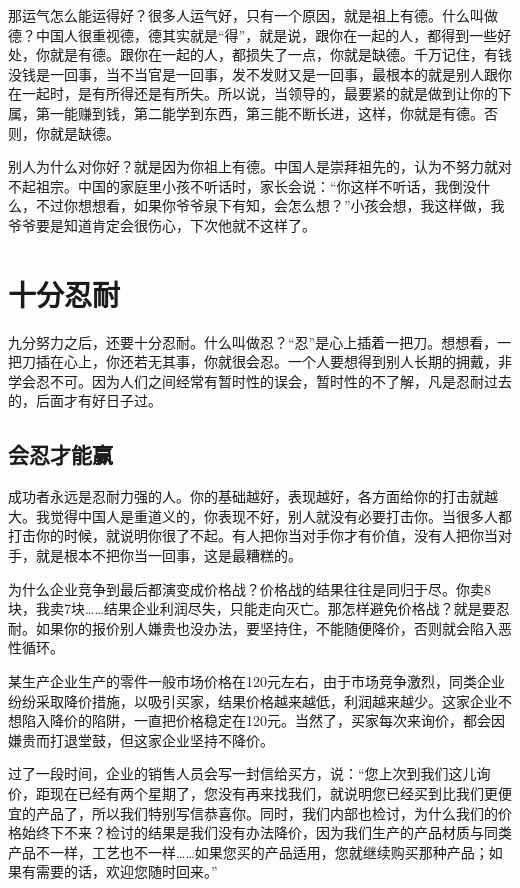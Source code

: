 \documentclass[fontset=fandol, a4paper, 12pt, openright]{ctexbook}
\begin{document}
那运气怎么能运得好？很多人运气好，只有一个原因，就是祖上有德。什么叫做德？中国人很重视德，德其实就是“得”，就是说，跟你在一起的人，都得到一些好处，你就是有德。跟你在一起的人，都损失了一点，你就是缺德。千万记住，有钱没钱是一回事，当不当官是一回事，发不发财又是一回事，最根本的就是别人跟你在一起时，是有所得还是有所失。所以说，当领导的，最要紧的就是做到让你的下属，第一能赚到钱，第二能学到东西，第三能不断长进，这样，你就是有德。否则，你就是缺德。

别人为什么对你好？就是因为你祖上有德。中国人是崇拜祖先的，认为不努力就对不起祖宗。中国的家庭里小孩不听话时，家长会说：“你这样不听话，我倒没什么，不过你想想看，如果你爷爷泉下有知，会怎么想？”小孩会想，我这样做，我爷爷要是知道肯定会很伤心，下次他就不这样了。


\chapter{十分忍耐}
九分努力之后，还要十分忍耐。什么叫做忍？“忍”是心上插着一把刀。想想看，一把刀插在心上，你还若无其事，你就很会忍。一个人要想得到别人长期的拥戴，非学会忍不可。因为人们之间经常有暂时性的误会，暂时性的不了解，凡是忍耐过去的，后面才有好日子过。

\section{会忍才能赢}

成功者永远是忍耐力强的人。你的基础越好，表现越好，各方面给你的打击就越大。我觉得中国人是重道义的，你表现不好，别人就没有必要打击你。当很多人都打击你的时候，就说明你很了不起。有人把你当对手你才有价值，没有人把你当对手，就是根本不把你当一回事，这是最糟糕的。

为什么企业竞争到最后都演变成价格战？价格战的结果往往是同归于尽。你卖8块，我卖7块……结果企业利润尽失，只能走向灭亡。那怎样避免价格战？就是要忍耐。如果你的报价别人嫌贵也没办法，要坚持住，不能随便降价，否则就会陷入恶性循环。

某生产企业生产的零件一般市场价格在120元左右，由于市场竞争激烈，同类企业纷纷采取降价措施，以吸引买家，结果价格越来越低，利润越来越少。这家企业不想陷入降价的陷阱，一直把价格稳定在120元。当然了，买家每次来询价，都会因嫌贵而打退堂鼓，但这家企业坚持不降价。

过了一段时间，企业的销售人员会写一封信给买方，说：“您上次到我们这儿询价，距现在已经有两个星期了，您没有再来找我们，就说明您已经买到比我们更便宜的产品了，所以我们特别写信恭喜你。同时，我们内部也检讨，为什么我们的价格始终下不来？检讨的结果是我们没有办法降价，因为我们生产的产品材质与同类产品不一样，工艺也不一样……如果您买的产品适用，您就继续购买那种产品；如果有需要的话，欢迎您随时回来。”
\end{document}

